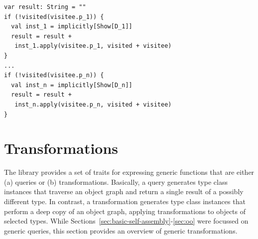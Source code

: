 \documentclass[preprint,nocopyrightspace]{sigplanconf}
\newcommand{\selfassembly}{\texttt{self-assembly~}}
\begin{document}
\begin{lstlisting}
var result: String = ""
if (!visited(visitee.p_1)) {
  val inst_1 = implicitly[Show[D_1]]
  result = result +
   inst_1.apply(visitee.p_1, visited + visitee)
}
...
if (!visited(visitee.p_n)) {
  val inst_n = implicitly[Show[D_n]]
  result = result +
   inst_n.apply(visitee.p_n, visited + visitee)
}
\end{lstlisting}
\noindent


\section{Transformations}\label{sec:queries-transformations}

The library provides a set of traits for expressing generic functions that are
either (a) queries or (b) transformations. Basically, a query generates type
class instances that traverse an object graph and return a single result of a
possibly different type. In contrast, a transformation generates type class
instances that perform a deep copy of an object graph, applying
transformations to objects of selected types. While
Sections~\ref{sec:basic-self-assembly}-\ref{sec:oo} were focussed on generic
queries, this section provides an overview of generic transformations.

\end{document}
